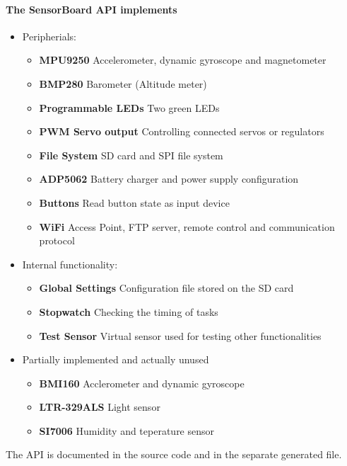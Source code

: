\paragraph{The SensorBoard \ac{API} implements}
\begin{itemize}
    \item Peripherials:
    \begin{itemize}
        \item \textbf{MPU9250} Accelerometer, dynamic gyroscope and magnetometer
        \item \textbf{BMP280} Barometer (Altitude meter)
        \item \textbf{Programmable LEDs} Two green LEDs
        \item \textbf{PWM Servo output} Controlling connected servos or regulators
        \item \textbf{File System} SD card and SPI file system
        \item \textbf{ADP5062} Battery charger and power supply configuration
        \item \textbf{Buttons} Read button state as input device
        \item \textbf{WiFi} Access Point, FTP server, remote control and communication protocol
    \end{itemize}
    \item Internal functionality:
    \begin{itemize}
        \item \textbf{Global Settings} Configuration file stored on the SD card
        \item \textbf{Stopwatch} Checking the timing of tasks
        \item \textbf{Test Sensor} Virtual sensor used for testing other functionalities
    \end{itemize}
    \item Partially implemented and actually unused
    \begin{itemize}
        \item \textbf{BMI160} Acclerometer and dynamic gyroscope
        \item \textbf{LTR-329ALS} Light sensor
        \item \textbf{SI7006} Humidity and teperature sensor
    \end{itemize}
\end{itemize}

The \ac{API} is documented in the source code and in the separate generated file.


